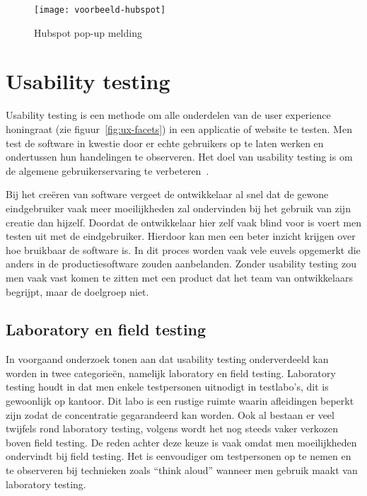 \begin{figure}
    \centering
    \texttt{[image: voorbeeld-hubspot]}
    \caption{Hubspot pop-up melding}
    \label{fig:ux-voorbeeld-hubspot}
\end{figure}

\section{Usability testing}
\label{sec:usability-testing}

Usability testing is een methode om alle onderdelen van de user experience honingraat (zie figuur~\ref{fig:ux-facets}) in een applicatie of website te testen. Men test de software in kwestie door er echte gebruikers op te laten werken en ondertussen hun handelingen te observeren. Het doel van usability testing is om de algemene gebruikerservaring te verbeteren~\autocite{Hotjar2020}.

Bij het creëren van software vergeet de ontwikkelaar al snel dat de gewone eindgebruiker vaak meer moeilijkheden zal ondervinden bij het gebruik van zijn creatie dan hijzelf. Doordat de ontwikkelaar hier zelf vaak blind voor is voert men testen uit met de eindgebruiker. Hierdoor kan men een beter inzicht krijgen over hoe bruikbaar de software is. In dit proces worden vaak vele euvels opgemerkt die anders in de productiesoftware zouden aanbelanden.
Zonder usability testing zou men vaak vast komen te zitten met een product dat het team van ontwikkelaars begrijpt, maar de doelgroep niet.

\subsection{Laboratory en field testing}
\label{sec:usability-testing:lab-field-testing}

In voorgaand onderzoek tonen \textcite{Kaikkonen2005} aan dat usability testing onderverdeeld kan worden in twee categorieën, namelijk laboratory en field testing. Laboratory testing houdt in dat men enkele testpersonen uitnodigt in testlabo's, dit is gewoonlijk op kantoor. Dit labo is een rustige ruimte waarin afleidingen beperkt zijn zodat de concentratie gegarandeerd kan worden. Ook al bestaan er veel twijfels rond laboratory testing, volgens \textcite{Kjeldskov2003} wordt het nog steeds vaker verkozen boven field testing. De reden achter deze keuze is vaak omdat men moeilijkheden ondervindt bij field testing. Het is eenvoudiger om testpersonen op te nemen en te observeren bij technieken zoals ``think aloud'' wanneer men gebruik maakt van laboratory testing.

